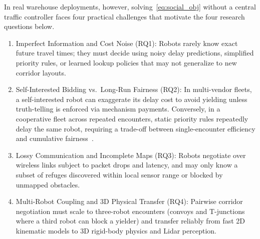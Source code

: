 In real warehouse deployments, however, solving~\eqref{eq:social_obj} without a central traffic controller faces four practical challenges that motivate the four research questions below.
\begin{enumerate}
\item Imperfect Information and Cost Noise (RQ1): Robots rarely know exact future travel times; they must decide using noisy delay predictions, simplified priority rules, or learned lookup policies that may not generalize to new corridor layouts.
\item Self-Interested Bidding vs.\ Long-Run Fairness (RQ2): In multi-vendor fleets, a self-interested robot can exaggerate its delay cost to avoid yielding unless truth-telling is enforced via mechanism payments. Conversely, in a cooperative fleet across repeated encounters, static priority rules repeatedly delay the same robot, requiring a trade-off between single-encounter efficiency and cumulative fairness~\cite{jain1984fairness}.
\item Lossy Communication and Incomplete Maps (RQ3): Robots negotiate over wireless links subject to packet drops and latency, and may only know a subset of refuges discovered within local sensor range or blocked by unmapped obstacles.
\item Multi-Robot Coupling and 3D Physical Transfer (RQ4): Pairwise corridor negotiation must scale to three-robot encounters (convoys and T-junctions where a third robot can block a yielder) and transfer reliably from fast 2D kinematic models to 3D rigid-body physics and Lidar perception.
\end{enumerate}
